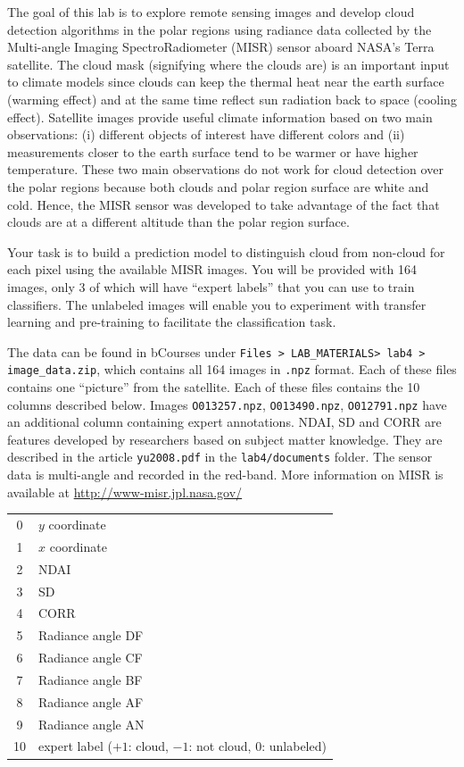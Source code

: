 \documentclass[letterpaper,12pt]{article}
\begin{document}
The goal of this lab is to explore remote sensing images and develop cloud detection algorithms in the polar regions using radiance data collected by the Multi-angle Imaging SpectroRadiometer (MISR) sensor aboard NASA’s Terra satellite. 
The cloud mask (signifying where the clouds are) is an important input to climate models since clouds can keep the thermal heat near the earth surface (warming effect) and at the same time reflect sun radiation back to space (cooling effect). 
Satellite images provide useful climate information based on two main observations: (i) different objects of interest have different colors and (ii) measurements closer to the earth surface tend to be warmer or have higher temperature. 
These two main observations do not work for cloud detection over the polar regions because both clouds and polar region surface are white and cold. 
Hence, the MISR sensor was developed to take advantage of the fact that clouds are at a different altitude than the polar region surface.

Your task is to build a prediction model to distinguish cloud from non-cloud for each pixel using the available MISR images. 
You will be provided with 164 images, only 3 of which will have ``expert labels'' that you can use to train classifiers. 
The unlabeled images will enable you to experiment with transfer learning and pre-training to facilitate the classification task.

The data can be found in bCourses under \texttt{Files > LAB\_MATERIALS> lab4 > image\_data.zip}, which contains all 164 images in \texttt{.npz} format.
Each of these files contains one ``picture'' from the satellite. Each of these files contains the 10 columns described below. Images \texttt{O013257.npz}, \texttt{O013490.npz}, \texttt{O012791.npz} have an additional column containing expert annotations. NDAI, SD and CORR are features developed by researchers based on subject matter knowledge. They are described in the article \texttt{yu2008.pdf} in the \texttt{lab4/documents} folder. The sensor data is multi-angle and recorded in the red-band. More information on MISR is available at \url{http://www-misr.jpl.nasa.gov/}

{\centering
\begin{tabular}{c|l}
    0 & $y$ coordinate \\
    1 & $x$ coordinate \\
    2 & NDAI \\
    3 & SD \\
    4 & CORR \\
    5 & Radiance angle DF \\
    6 & Radiance angle CF \\
    7 & Radiance angle BF \\
    8 & Radiance angle AF \\
    9 & Radiance angle AN \\\hline
    10 & expert label ($+1$: cloud, $-1$: not cloud, $0$: unlabeled) \\
\end{tabular}\par
}
\end{document}
